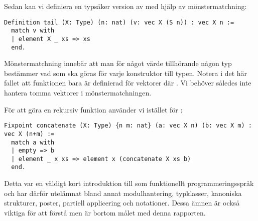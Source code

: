 Sedan kan vi definiera en typsäker version av  med hjälp av
mönstermatchning:
\begin{lstlisting}
Definition tail (X: Type) (n: nat) (v: vec X (S n)) : vec X n :=
  match v with
  | element X _ xs => xs
  end.
\end{lstlisting}
Mönstermatchning innebär att man för något värde tillhörande någon typ
bestämmer vad som ska göras för varje konstruktor till typen. Notera i det här
fallet att funktionen bara är definierad för vektorer  där . Vi behöver således inte hantera tomma vektorer i mönstermatchningen.

För att göra en rekursiv funktion använder vi  istället för
:
\begin{lstlisting}
Fixpoint concatenate (X: Type) {n m: nat} (a: vec X n) (b: vec X m) : vec X (n+m) :=
  match a with
  | empty => b
  | element _ x xs => element x (concatenate X xs b)
  end.
\end{lstlisting}

Detta var en väldigt kort introduktion till \coq{} som funktionellt
programmeringsspråk och har därför utelämnat bland annat modulhantering,
typklasser, kanoniska strukturer, poster, partiell applicering och notationer.
Dessa ämnen är också viktiga för att förstå \coq{} men är bortom målet med denna
rapporten.
